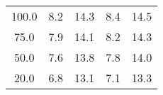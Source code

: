 \begin{tabular}{ccccc}
\hline
100.0 & 8.2 & 14.3 & 8.4 & 14.5 \\
75.0 & 7.9 & 14.1 & 8.2 & 14.3 \\
50.0 & 7.6 & 13.8 & 7.8 & 14.0 \\
20.0 & 6.8 & 13.1 & 7.1 & 13.3 \\
\hline
\end{tabular}
